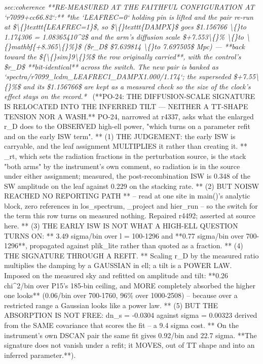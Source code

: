 \begin{description}
\textit{sec:coherence  **RE-MEASURED AT THE FAITHFUL CONFIGURATION AT `r7099+cc66.82`:** *the `LEAFREC=0` holding pin is lifted and the pair re-run at \$\textbackslash\{\}texttt\{LEAFREC=1\}\$, so \$\textbackslash\{\}texttt\{DAMPX\}\$ goes \$1.156766 \textbackslash\{\}to 1.174306 = 1.08365410\textasciicircum{}2\$ and the arm's diffusion scale \$+7.553\textbackslash\{\}\% \textbackslash\{\}to \textbackslash\{\}mathbf\{+8.365\textbackslash\{\}\%\}\$ (\$r\_D\$ \$7.639814 \textbackslash\{\}to 7.697505\$ Mpc) --- **back toward the \$\{\textbackslash\{\}sim\}9\textbackslash\{\}\%\$ the row originally carried**, with the control's \$r\_D\$ **bit-identical** across the switch. The new pair is banked as `spectra/r7099\_lcdm\_LEAFREC1\_DAMPX1.000/1.174`; the superseded \$+7.55\textbackslash\{\}\%\$ and its \$1.156766\$ are kept as a measured check so the size of the clock's effect stays on the record.*} \ (**PO-24: THE DIFFUSION-SCALE SIGNATURE IS RELOCATED INTO THE INFERRED TILT --- NEITHER A TT-SHAPE TENSION NOR A WASH.** PO-24, narrowed at r4337, asks what the enlarged r\_D does to the OBSERVED high-ell power, "which turns on a parameter refit and on the early ISW term". ** (1) THE JUDGEMENT: the early ISW is carryable, and the leaf assignment MULTIPLIES it rather than creating it. ** \_rt, which sets the radiation fractions in the perturbation source, is the stack "both arms" by the instrument's own comment, so radiation is in the source under either assignment; measured, the post-recombination ISW is 0.348 of the SW amplitude on the leaf against 0.229 on the stacking rate. ** (2) BUT NOISW REACHED NO REPORTING PATH ** -- read at one site in main()'s analytic block, zero references in los\_spectrum, \_project and hier\_run -- so the switch for the term this row turns on measured nothing. Repaired r4492; asserted at source here. ** (3) THE EARLY ISW IS NOT WHAT A HIGH-ELL QUESTION TURNS ON: ** 3.49 sigma/bin over l = 100-1296 and **0.77 sigma/bin over 700-1296**, propagated against plik\_lite rather than quoted as a fraction. ** (4) THE SIGNATURE THROUGH A REFIT. ** Scaling r\_D by the measured ratio multiplies the damping by a GAUSSIAN in ell; a tilt is a POWER LAW. Imposed on the measured sky and refitted on amplitude and tilt: **0.26 chi\textasciicircum{}2/bin over P15's 185-bin ceiling, and MORE completely absorbed the higher one looks** (0.06/bin over 700-1760, 96\% over 1000-2508) -- because over a restricted range a Gaussian looks like a power law. ** (5) BUT THE ABSORPTION IS NOT FREE: dn\_s = -0.0304 against sigma = 0.00323 derived from the SAME covariance that scores the fit -- a 9.4 sigma cost. ** On the instrument's own DSCAN pair the same fit gives 0.92/bin and 22.7 sigma. **The signature does not vanish under a refit; it MOVES, out of TT shape and into an inferred parameter.**). 

\end{description}
